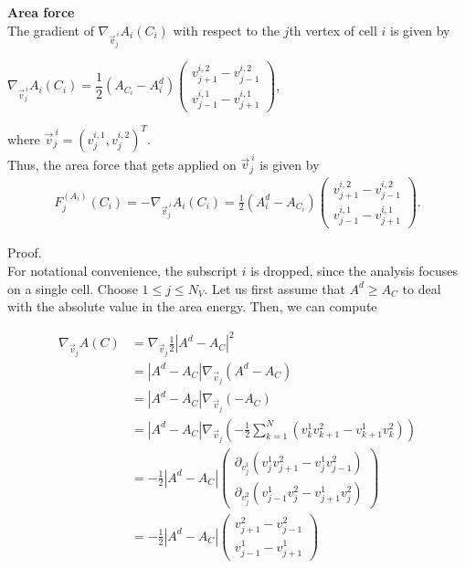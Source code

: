 \begin{proposition} \textbf{Area force} \\
	The gradient of $\nabla_{\vec{v}^{\: i}_j} A_i(C_i)$ with respect to the $j$th vertex of cell $i$ is given by 
	\begin{center}
		$\nabla_{\vec{v}^{\: i}_j} A_i(C_i) = \dfrac{1}{2} (A_{C_i} - A_i^d) \begin{pmatrix} v_{j+1}^{i,2} - v_{j-1}^{i,2} \\[0.5em]  v_{j-1}^{i,1} - v_{j+1}^{i,1} \end{pmatrix}$, 
	\end{center}
	where $\vec{v}^{\: i}_j = (v_{j}^{i,1}, v_{j}^{i,2})^T$. \\

	Thus, the area force that gets applied on $\vec{v}^{\: i}_j$ is given by 
	\begin{align}
		F_{j}^{(A_i)}(C_i) 
		= - \nabla_{\vec{v}^{\: i}_j} A_i(C_i) 
		= \frac{1}{2}(A_i^d - A_{C_i}) \begin{pmatrix} v_{j+1}^{i,2} - v_{j-1}^{i,2} \\[0.5em]  v_{j-1}^{i,1} - v_{j+1}^{i,1} \end{pmatrix}.
	\end{align}



	Proof.\\
	For notational convenience, the subscript $i$ is dropped, since the analysis focuses on a single cell.
	Choose $1 \leq j \leq N_V$.  
	Let us first assume that $A^d \geq A_{C}$ to deal with the absolute value in the area energy. 
	Then, we can compute 
 
	\begin{align*}
		\nabla_{\vec{v}_j} A(C) &= \nabla_{\vec{v}_j} \frac{1}{2} | A^d - A_{C} |^2  \\ 
		&=   |A^d - A_{C}| \nabla_{\vec{v}_j} ( A^d - A_{C})  \\
		&=   |A^d - A_{C}| \nabla_{\vec{v}_j} ( - A_{C}) \\ 
		&=   |A^d - A_{C}| \nabla_{\vec{v}_j} ( - \frac{1}{2} \sum\limits_{k = 1}^{N} (v_k^1 v_{k+1}^2 - v_{k+1}^1 v_k^2)) \\[0.5em]  
		&=   - \frac{1}{2} |A^d - A_{C}| \begin{pmatrix}
			\partial_{v_j^1} (v_j^1 v_{j+1}^2 - v_j^1 v_{j-1}^2)  \\[0.5em]
			\partial_{v_j^2} (v_{j-1}^1 v_j^2 - v_{j+1}^1 v_j^2)
		\end{pmatrix} \\[0.5em] 
		&=   - \frac{1}{2} |A^d - A_{C}| \begin{pmatrix}
			  v_{j+1}^2 - v_{j-1}^2  \\
			 v_{j-1}^1  - v_{j+1}^1 
		\end{pmatrix} 
	\end{align*}


\end{proposition}
